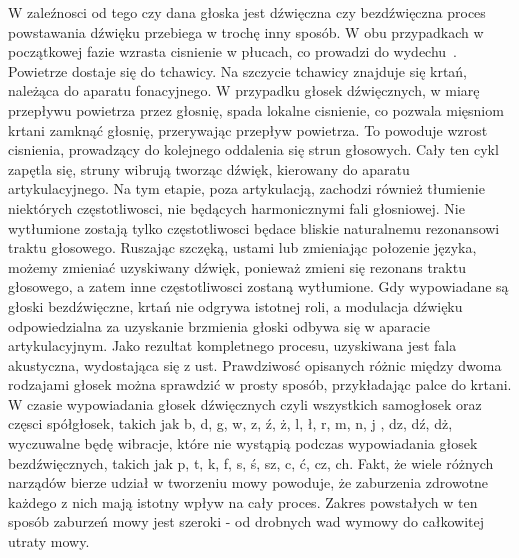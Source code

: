\documentclass[a4paper,12 pt]{article}
\begin{document}
 W zaleźnosci od tego czy dana głoska jest dźwięczna czy bezdźwięczna proces powstawania dźwięku przebiega w trochę inny sposób. W obu przypadkach w początkowej fazie wzrasta cisnienie w płucach, co prowadzi do wydechu~\cite{produkcja_mowy}. Powietrze dostaje się do tchawicy. Na szczycie tchawicy znajduje się krtań, należąca do aparatu fonacyjnego. W przypadku głosek dźwięcznych, w miarę przepływu powietrza przez głosnię, spada lokalne cisnienie, co pozwala mięsniom krtani zamknąć głosnię, przerywając przepływ powietrza. To powoduje wzrost cisnienia, prowadzący do kolejnego oddalenia się strun głosowych. Cały ten cykl zapętla się, struny wibrują tworząc dźwięk, kierowany do aparatu artykulacyjnego. Na tym etapie, poza artykulacją, zachodzi również tłumienie niektórych częstotliwosci, nie będących harmonicznymi fali głosniowej. Nie wytłumione zostają tylko częstotliwosci będace bliskie naturalnemu rezonansowi traktu głosowego. Ruszając szczęką, ustami lub zmieniając połozenie języka, możemy zmieniać uzyskiwany dźwięk, ponieważ zmieni się rezonans traktu głosowego, a zatem inne częstotliwosci zostaną wytłumione. Gdy wypowiadane są głoski bezdźwięczne, krtań nie odgrywa istotnej roli, a modulacja dźwięku odpowiedzialna za uzyskanie brzmienia głoski odbywa się w aparacie artykulacyjnym. Jako rezultat kompletnego procesu, uzyskiwana jest fala akustyczna, wydostająca się z ust. Prawdziwosć opisanych różnic między dwoma rodzajami głosek można sprawdzić w prosty sposób, przykładając palce do krtani. W czasie wypowiadania głosek dźwięcznych czyli wszystkich samogłosek oraz częsci spółgłosek, takich jak b, d, g, w, z, ź, ż, l, ł, r, m, n, j , dz, dź, dż, wyczuwalne będę wibracje, które nie wystąpią podczas wypowiadania głosek bezdźwięcznych, takich jak p, t, k, f, s, ś, sz, c, ć, cz, ch.
Fakt, że wiele różnych narządów bierze udział w tworzeniu mowy powoduje, że zaburzenia zdrowotne każdego z nich mają istotny wpływ na cały proces. Zakres powstałych w ten sposób zaburzeń mowy jest szeroki - od drobnych wad wymowy do całkowitej utraty mowy.
\end{document}
